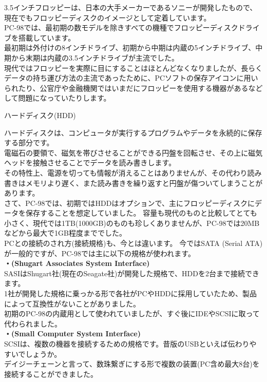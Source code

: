 \documentclass[b5paper,9pt,platex,dvipdfmx]{jsarticle}
\begin{document}
\begin{multicols*}{3}
\begin{enumerate}
  3.5インチフロッピーは、日本の大手メーカーであるソニーが開発したもので、現在でもフロッピーディスクのイメージとして定着しています。\\
  PC-98では、最初期の数モデルを除きすべての機種でフロッピーディスクドライブを搭載しています。\\
  最初期は外付けの8インチドライブ、初期から中期は内蔵の5インチドライブ、中期から末期は内蔵の3.5インチドライブが主流でした。\\
  現代ではフロッピーを実際に目にすることはほとんどなくなりましたが、長らくデータの持ち運び方法の主流であったために、PCソフトの保存アイコンに用いられたり、公官庁や金融機関ではいまだにフロッピーを使用する機器があるなどして問題になっていたりします。
  {\bf  \item ハードディスク(HDD)\\}
  ハードディスクは、コンピュータが実行するプログラムやデータを永続的に保存する部分です。\\
  電磁石の要領で、磁気を帯びさせることができる円盤を回転させ、その上に磁気ヘッドを接触させることでデータを読み書きします。\\
  その特性上、電源を切っても情報が消えることはありませんが、その代わり読み書きはメモリより遅く、また読み書きを繰り返すと円盤が傷ついてしまうことがあります。\\
  さて、PC-98では、初期ではHDDはオプションで、主にフロッピーディスクにデータを保存することを想定していました。
  容量も現代のものと比較してとても小さく、現代では1TB(1000GB)のものも珍しくありませんが、PC-98では20MBなどから最大で1GB程度まででした。\\
  PCとの接続のされ方(接続規格)も、今とは違います。
  今ではSATA (Serial ATA)が一般的ですが、PC-98では主に以下の規格が使われます。\\
  {\bf・(Shugart Associates System Interface)\\}
  SASIはShugart社(現在のSeagate社)が開発した規格で、HDDを2台まで接続できます。\\
  1社が開発した規格に乗っかる形で各社がPCやHDDに採用していたため、製品によって互換性がないことがありました。\\
  初期のPC-98の内蔵用として使われていましたが、すぐ後にIDEやSCSIに取って代わられました。\\
  {\bf・(Small Computer System Interface)\\}
  SCSIは、複数の機器を接続するための規格です。昔版のUSBといえば伝わりやすいでしょうか。\\
  デイジーチェーンと言って、数珠繋ぎにする形で複数の装置(PC含め最大8台)を接続することができました。\\

\end{enumerate}
\end{multicols*}
\end{document}
